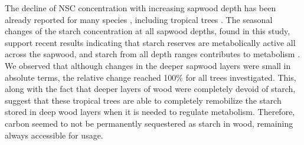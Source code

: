 \documentclass{article}
\begin{document}
The decline of NSC concentration with increasing sapwood depth has been already reported for many species \citep{fischer:1991, Barbaroux:2002, Hoch:2003, Richardson:2015, Fuze2020}, including tropical trees \citep{Newell:2002, Wurth:2005}. The seasonal changes of the starch concentration at all sapwood depths, found in this study, support recent results indicating that starch reserves are metabolically active all across the sapwood, and starch from all depth ranges contributes to metabolism \citep{Trumbore:2015, Fuze2020}. We observed that although changes in the deeper sapwood layers were small in absolute terms, the relative change reached 100\% for all trees investigated. This, along with the fact that deeper layers of wood were completely devoid of starch, suggest that these tropical trees are able to completely remobilize the starch stored in deep wood layers when it is needed to regulate metabolism. Therefore, carbon seemed to not be permanently sequestered as starch in wood, remaining always accessible for usage.
\end{document}
